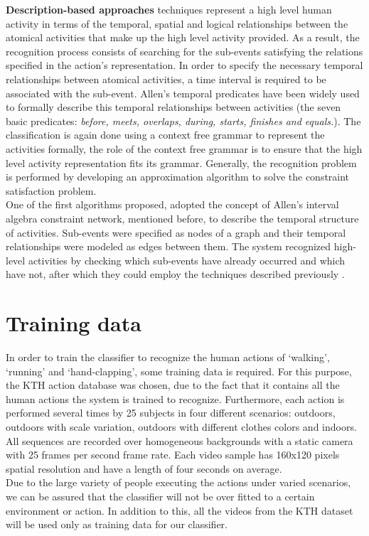 \documentclass[11pt]{report}
\begin{document}
\textbf{Description-based approaches} techniques represent a high level human activity in terms of the temporal, spatial and logical relationships between the atomical activities that make up the high level activity provided. As a result, the recognition process consists of searching for the sub-events satisfying the relations specified in the action's representation. In order to specify the necessary temporal relationships between atomical activities, a time interval is required to be associated with the sub-event. Allen's temporal predicates \cite{allen-pred} have been widely used to formally describe this temporal relationships between activities (the seven basic predicates: \textit{before, meets, overlaps, during, starts, finishes and equals.}). The classification is again done using a context free grammar to represent the activities formally, the role of the context free grammar is to ensure that the high level activity representation fits its grammar. Generally, the recognition problem is performed by developing an approximation algorithm to solve the constraint satisfaction problem. \\
One of the first algorithms proposed, adopted the concept of Allen's interval algebra constraint network, mentioned before, to describe the temporal structure of activities. Sub-events were specified as nodes of a graph and their temporal relationships were modeled as edges between them. The system recognized high-level activities by checking which sub-events have already occurred and which have not, after which they could employ the techniques described previously \cite{IA-network}. \\

\section{Training data}
In order to train the classifier to recognize the human actions of `walking', `running' and `hand-clapping', some training data is required. For this purpose, the KTH action database was chosen, due to the fact that it contains all the human actions the system is trained to recognize. Furthermore, each action is performed several times by 25 subjects in four different scenarios: outdoors, outdoors with scale variation, outdoors with different clothes colors and indoors. All sequences are recorded over homogeneous backgrounds with a static camera with 25 frames per second frame rate. Each video sample has 160x120 pixels spatial resolution and have a length of four seconds on average. \\
Due to the large variety of people executing the actions under varied scenarios, we can be assured that the classifier will not be over fitted to a certain environment or action. In addition to this, all the videos from the KTH dataset will be used only as training data for our classifier. \\
\end{document}
